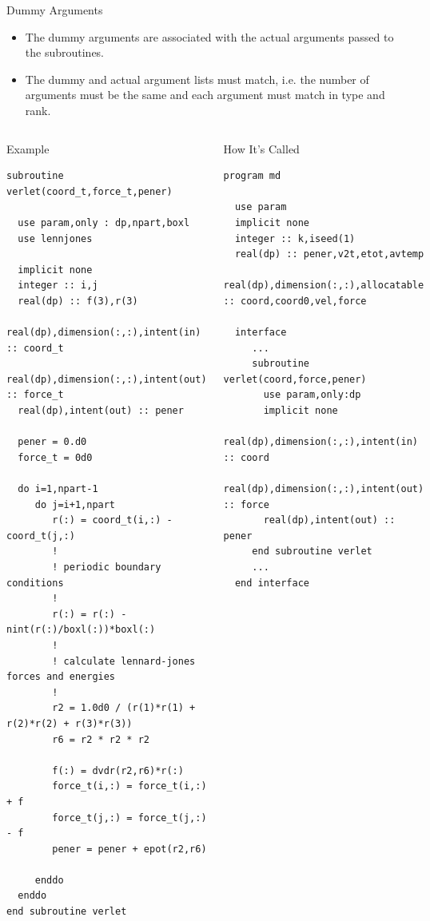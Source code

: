 \documentclass[slidestop,mathserif,compress,xcolor=svgnames]{beamer}
\newenvironment{eblock}[0]
{
\begin{beamerboxesrounded}[upper=uppercol2,lower=lowercol2,shadow=true]}
{\end{beamerboxesrounded}}
\newenvironment{eeblock}[0]
{
\begin{beamerboxesrounded}[upper=uppercol4,lower=lowercol4,shadow=true]}
{\end{beamerboxesrounded}}
\begin{document}
\begin{frame}
\begin{block}{\scriptsize Dummy Arguments}
\begin{itemize}
      \item The dummy arguments are associated with the actual arguments passed to the subroutines.
      \item The dummy and actual argument lists must match, i.e. the number of arguments must be the same and each argument must match in type and rank.
    \end{itemize}
  \end{block}
  \framebreak
  {\fontsize{4}{5}
    \begin{columns}
      \column{4.5cm}
      \begin{eeblock}{Example}
        \begin{verbatim}
subroutine verlet(coord_t,force_t,pener)

  use param,only : dp,npart,boxl
  use lennjones

  implicit none
  integer :: i,j
  real(dp) :: f(3),r(3)
  real(dp),dimension(:,:),intent(in) :: coord_t
  real(dp),dimension(:,:),intent(out) :: force_t
  real(dp),intent(out) :: pener
  
  pener = 0.d0
  force_t = 0d0
  
  do i=1,npart-1
     do j=i+1,npart
        r(:) = coord_t(i,:) - coord_t(j,:)
        !
        ! periodic boundary conditions
        !
        r(:) = r(:) - nint(r(:)/boxl(:))*boxl(:)
        !
        ! calculate lennard-jones forces and energies
        !
        r2 = 1.0d0 / (r(1)*r(1) + r(2)*r(2) + r(3)*r(3))
        r6 = r2 * r2 * r2

        f(:) = dvdr(r2,r6)*r(:)
        force_t(i,:) = force_t(i,:) + f
        force_t(j,:) = force_t(j,:) - f
        pener = pener + epot(r2,r6)

     enddo
  enddo
end subroutine verlet
       \end{verbatim}
      \end{eeblock}
      \column{6.5cm}
      \begin{eblock}{How It's Called}
        \begin{verbatim}
program md

  use param
  implicit none
  integer :: k,iseed(1)
  real(dp) :: pener,v2t,etot,avtemp
  real(dp),dimension(:,:),allocatable :: coord,coord0,vel,force

  interface
     ...
     subroutine verlet(coord,force,pener)
       use param,only:dp
       implicit none
       real(dp),dimension(:,:),intent(in) :: coord
       real(dp),dimension(:,:),intent(out) :: force
       real(dp),intent(out) :: pener
     end subroutine verlet
     ...
  end interface
  

\end{verbatim}
\end{eblock}
\end{columns}}
\end{frame}
\end{document}
